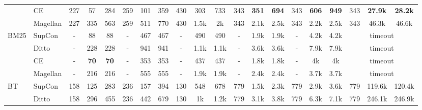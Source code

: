\documentclass[sigconf,nonacm]{acmart}
\begin{document}
\begin{table*}[]
\begin{tabular}{@{}ll|ccc|ccc|ccc|ccc|ccc|ccc@{}}
                     & CE       & 227                   & 57          & 284         & 259                   & 101         & 359          & 430                   & 303          & 733          & 343                   & \textbf{351} & \textbf{694} & 343                   & \textbf{606} & \textbf{949} & 343 & \textbf{27.9k} & \textbf{28.2k} \\
                     & Magellan & 227                   & 335         & 563         & 259                   & 511         & 770          & 430                   & 1.5k         & 2k           & 343                   & 2.1k         & 2.5k         & 343                   & 2.2k         & 2.5k         & 343 & 46.3k          & 46.6k          \\ \midrule
BM25                & SupCon   & - & 88          & 88          & - & 467         & 467          & - & 490          & 490          & - & 1.9k         & 1.9k         & - & 4.2k         & 4.2k         & \multicolumn{3}{c}{timeout}           \\
 & Ditto    & - & 228         & 228         & - & 941         & 941          & - & 1.1k         & 1.1k         & - & 3.6k         & 3.6k         & - & 7.9k         & 7.9k         & \multicolumn{3}{c}{timeout}           \\
                     & CE       & - & \textbf{70} & \textbf{70} & - & 353         & 353          & - & 437          & 437          & - & 1.8k         & 1.8k         & - & 4k           & 4k           & \multicolumn{3}{c}{timeout}           \\
                     & Magellan & - & 216         & 216         & - & 555         & 555          & - & 1.9k         & 1.9k         & - & 2.4k         & 2.4k         & - & 3.7k         & 3.7k         & \multicolumn{3}{c}{timeout}           \\ \midrule
BT                   & SupCon   & 158                   & 125         & 283         & 236                   & 157         & 394          & 130                   & 548          & 678          & 779                   & 1.5k         & 2.3k         & 779                   & 2.9k         & 3.6k         & 779 & 119.6k         & 120.4k         \\
                     & Ditto    & 158                   & 296         & 455         & 236                   & 442         & 679          & 130                   & 1k           & 1.2k         & 779                   & 3.1k         & 3.8k         & 779                   & 6.3k         & 7.1k         & 779 & 246.1k         & 246.9k         \\

\end{tabular}
\end{table*}
\end{document}
